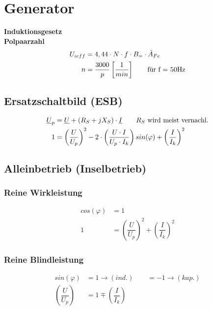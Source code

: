 \section{Generator}
\textbf{Induktionsgesetz}\\
\textbf{Polpaarzahl}
\begin{align*}
    U_{ieff} &= 4,44 \cdot N \cdot f \cdot B_= \cdot \hat{A}_{Fe} \\
    n &= \dfrac{3000}{p} \left[ \frac{1}{min}\right] \qquad \textnormal{für f = 50Hz}
\end{align*}

\subsection{Ersatzschaltbild (ESB)}
\begin{align*}
    \underline{U}_p &= \underline{U} + (R_S + jX_S) \cdot \underline{I} \qquad \textnormal{$R_S$ wird meist vernachl.}\\
    1 &= \left( \dfrac{U}{U_p} \right)^2 - 2 \cdot \left( \dfrac{U \cdot I}{U_p \cdot I_k}\right) sin(\varphi) + \left(\dfrac{I}{I_k}\right)^2
\end{align*}

\subsection{Alleinbetrieb (Inselbetrieb)}
\subsubsection{Reine Wirkleistung}
\begin{align*}
    cos(\varphi) &= 1\\
    1 &= \left( \dfrac{U}{U_p} \right)^2 + \left(\dfrac{I}{I_k}\right)^2
\end{align*}

\subsubsection{Reine Blindleistung}
\begin{align*}
    sin(\varphi) &= 1 \rightarrow (ind.) \qquad =-1 \rightarrow (kap.)\\
    \left( \dfrac{U}{U_p} \right) &= 1 \mp \left(\dfrac{I}{I_k}\right)
\end{align*}

